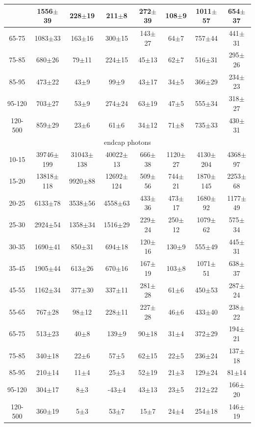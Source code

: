 \begin{table}[h]
\begin{center}
\begin{tabular}{|c|c|c|c|c|c|c|c|}
{55-65 & 1556$\pm$39 & 228$\pm$19 & 211$\pm$8 & 272$\pm$39 & 108$\pm$9 & 1011$\pm$57 & 654$\pm$37 \\ \hline
65-75 & 1083$\pm$33 & 163$\pm$16 & 300$\pm$15 & 143$\pm$27 & 64$\pm$7 & 757$\pm$44 & 441$\pm$31 \\ \hline
75-85 & 680$\pm$26 & 79$\pm$11 & 224$\pm$15 & 45$\pm$13 & 62$\pm$7 & 516$\pm$31 & 295$\pm$26 \\ \hline
85-95 & 473$\pm$22 & 43$\pm$9 & 99$\pm$9 & 43$\pm$17 & 34$\pm$5 & 366$\pm$29 & 234$\pm$23 \\ \hline
95-120 & 703$\pm$27 & 53$\pm$9 & 274$\pm$24 & 63$\pm$19 & 47$\pm$5 & 555$\pm$34 & 318$\pm$27 \\ \hline
120-500 & 859$\pm$29 & 23$\pm$6 & 61$\pm$6 & 34$\pm$12 & 71$\pm$8 & 735$\pm$33 & 430$\pm$31 \\ \hline
\multicolumn{8}{|c|}{endcap photons}\\ \hline
10-15 & 39746$\pm$199 & 31043$\pm$138 & 40022$\pm$13 & 666$\pm$38 & 1120$\pm$27 & 4130$\pm$204 & 4368$\pm$97 \\ \hline
15-20 & 13818$\pm$118 & 9920$\pm$88 & 12692$\pm$124 & 509$\pm$56 & 744$\pm$21 & 1870$\pm$145 & 2253$\pm$68 \\ \hline
20-25 & 6133$\pm$78 & 3538$\pm$56 & 4558$\pm$63 & 433$\pm$36 & 473$\pm$17 & 1680$\pm$92 & 1177$\pm$49 \\ \hline
25-30 & 2924$\pm$54 & 1358$\pm$34 & 1516$\pm$29 & 229$\pm$24 & 250$\pm$12 & 1079$\pm$62 & 575$\pm$34 \\ \hline
30-35 & 1690$\pm$41 & 850$\pm$31 & 694$\pm$18 & 120$\pm$16 & 130$\pm$9 & 555$\pm$49 & 445$\pm$31 \\ \hline
35-45 & 1905$\pm$44 & 613$\pm$26 & 670$\pm$16 & 167$\pm$19 & 103$\pm$8 & 1071$\pm$51 & 638$\pm$37 \\ \hline
45-55 & 1162$\pm$34 & 377$\pm$30 & 337$\pm$11 & 281$\pm$28 & 61$\pm$6 & 450$\pm$53 & 287$\pm$24 \\ \hline
55-65 & 767$\pm$28 & 98$\pm$12 & 228$\pm$11 & 227$\pm$28 & 46$\pm$6 & 433$\pm$40 & 238$\pm$22 \\ \hline
65-75 & 513$\pm$23 & 40$\pm$8 & 139$\pm$9 & 90$\pm$18 & 31$\pm$4 & 372$\pm$29 & 194$\pm$21 \\ \hline
75-85 & 340$\pm$18 & 22$\pm$6 & 57$\pm$5 & 62$\pm$15 & 22$\pm$5 & 236$\pm$24 & 137$\pm$18 \\ \hline
85-95 & 210$\pm$14 & 11$\pm$4 & 25$\pm$3 & 52$\pm$19 & 21$\pm$3 & 129$\pm$24 & 81$\pm$14 \\ \hline
95-120 & 304$\pm$17 & 8$\pm$3 & -43$\pm$4 & 43$\pm$13 & 23$\pm$5 & 212$\pm$22 & 166$\pm$20 \\ \hline
120-500 & 360$\pm$19 & 5$\pm$3 & 53$\pm$7 & 15$\pm$7 & 24$\pm$4 & 254$\pm$18 & 146$\pm$19 \\ \hline
  \end{tabular}
  \label{tab:yields_Wg_to_enu_}
  \end{center}
\end{table}
